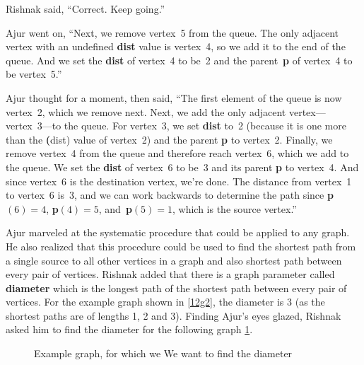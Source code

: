 Rishnak said, ``Correct. Keep going.''

Ajur went on, ``Next, we remove vertex~5 from the queue. The only adjacent vertex with an undefined \textbf{dist} value is vertex~4, so we add it to the end of the queue. And we set the \textbf{dist} of vertex~4 to be~2 and the parent~\textbf{p} of vertex~4 to be vertex~5.''

Ajur thought for a moment, then said, ``The first element of the queue is now vertex~2, which we remove next. Next, we add the only adjacent vertex---vertex~3---to the queue. For vertex~3, we set \textbf{dist} to~2 (because it is one more than the \textbf(dist) value of vertex~2) and the parent \textbf{p} to vertex~2. Finally, we remove vertex~4 from the queue and therefore reach vertex~6, which we add to the queue. We set the \textbf{dist} of vertex~6 to be~3 and its parent \textbf{p} to vertex~4. And since vertex~6 is the destination vertex, we're done. The distance from vertex~1 to vertex~6 is~3, and we can work backwards to determine the path since \textbf{p}$(6)=4$, \textbf{p}$(4)=5$, and~\textbf{p}$(5)=1$, which is the source vertex.''

Ajur marveled at the systematic procedure that could be applied to any graph. He also realized that this procedure could be used to find the shortest path from a single source to all other vertices in a graph and also shortest path between every pair of vertices. Rishnak added that there is a graph parameter called \textbf{diameter} which is the longest path of the shortest path between every pair of vertices. For the example graph shown in \ref{12g2}, the diameter is 3 (as the shortest paths are of lengths 1, 2 and 3). Finding Ajur's eyes glazed, Rishnak asked him to find the diameter for the following graph \ref{12g3}.  

\begin{figure}
\begin{center}
\caption{ Example graph, for which we We want to find the diameter }\label{12g3}
\end{center}
\end{figure}

